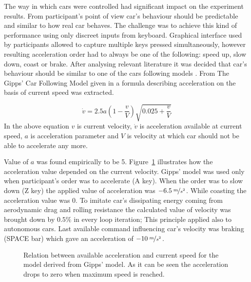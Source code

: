 \documentclass[11pt,english]{article}
\begin{document}
The way in which cars were controlled had significant impact on the experiment results. From participant's point of view car's behaviour should be predictable and similar to how real car behaves. The challenge was to achieve this kind of performance using only discreet inputs from keyboard. Graphical interface used by participants allowed to capture multiple keys pressed simultaneously, however resulting acceleration order had to always be one of the following: speed up, slow down, coast or brake. After analysing relevant literature it was decided that car's behaviour should be similar to one of the cars following models \citep{treiber2013traffic}. From The Gipps' Car Following Model given in \citet{spyropoulou2007simulation} a formula describing acceleration on the basis of current speed was extracted.

\begin{equation}
\dot{v}=2.5a(1- \frac{v}{V})\sqrt{0.025+ \frac{v}{V}}
\end{equation}
In the above equation $v$ is current velocity, $\dot{v}$ is acceleration available at current speed, $a$ is acceleration parameter and $V$ is velocity at which car should not be able to accelerate any more.

Value of $a$ was found empirically to be 5. Figure~\ref{fig:gipps} illustrates how the acceleration value depended on the current velocity. Gipps' model was used only when participant's order was to accelerate (A key). When the order was to slow down (Z key) the applied value of acceleration was $-6.5\:\nicefrac{m}{s^2}$. While coasting the acceleration value was $0$. To imitate car's dissipating energy coming from aerodynamic drag and rolling resistance the calculated value of velocity was brought down by $0.5\%$ in every loop iteration; This principle applied also to autonomous cars. Last available command influencing car's velocity was braking (SPACE bar) which gave an acceleration of $-10\:\nicefrac{m}{s^2}$.


\begin{figure}[!] %
\caption{Relation between available acceleration and current speed for the model derived from Gipps' model. As it can be seen the acceleration drops to zero when maximum speed is reached.}
\label{fig:gipps}
\end{figure} 
\end{document}
